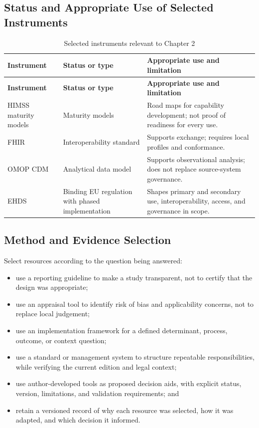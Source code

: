 \subsection{Status and Appropriate Use of Selected Instruments}
\begin{longtable}{@{}p{}p{}p{}@{}}
\caption{Selected instruments relevant to Chapter 2}
\label{tab:comp-ch02-instrument-status}\\
\toprule
\textbf{Instrument} & \textbf{Status or type} & \textbf{Appropriate use and limitation} \\
\midrule
\endfirsthead
\toprule
\textbf{Instrument} & \textbf{Status or type} & \textbf{Appropriate use and limitation} \\
\midrule
\endhead
\bottomrule
\endlastfoot
HIMSS maturity models & Maturity models & Road maps for capability development; not proof of readiness for every use. \\
FHIR & Interoperability standard & Supports exchange; requires local profiles and conformance. \\
OMOP CDM & Analytical data model & Supports observational analysis; does not replace source-system governance. \\
EHDS & Binding EU regulation with phased implementation & Shapes primary and secondary use, interoperability, access, and governance in scope. \\
\end{longtable}

\subsection{Method and Evidence Selection}
Select resources according to the question being answered:
\begin{itemize}
 \item use a reporting guideline to make a study transparent, not to certify that the design was appropriate;
 \item use an appraisal tool to identify risk of bias and applicability concerns, not to replace local judgement;
 \item use an implementation framework for a defined determinant, process, outcome, or context question;
 \item use a standard or management system to structure repeatable responsibilities, while verifying the current edition and legal context;
 \item use author-developed tools as proposed decision aids, with explicit status, version, limitations, and validation requirements; and
 \item retain a versioned record of why each resource was selected, how it was adapted, and which decision it informed.
\end{itemize}

